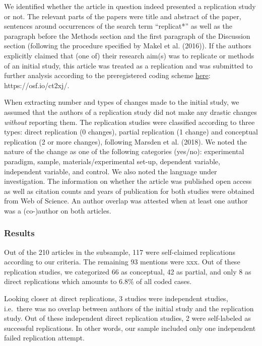 \documentclass[]{elsarticle} %
\begin{document}
We identified whether the article in question indeed presented a
replication study or not. The relevant parts of the papers were title
and abstract of the paper, sentences around occurrences of the search
term ``replicat*'' as well as the paragraph before the Methods section
and the first paragraph of the Discussion section (following the
procedure specified by Makel et al. (2016)). If the authors explicitly
claimed that (one of) their research aim(s) was to replicate or methods
of an initial study, this article was treated as a replication and was
submitted to further analysis according to the preregistered coding
scheme \href{https://osf.io/ct2xj/}{here}: https://osf.io/ct2xj/.

When extracting number and types of changes made to the initial study,
we assumed that the authors of a replication study did not make any
drastic changes \emph{without} reporting them. The replication studies
were classified according to three types: direct replication (0
changes), partial replication (1 change) and conceptual replication (2
or more changes), following Marsden et al. (2018). We noted the nature
of the change as one of the following categories (yes/no): experimental
paradigm, sample, materials/experimental set-up, dependent variable,
independent variable, and control. We also noted the language under
investigation. The information on whether the article was published open
access as well as citation counts and years of publication for both
studies were obtained from Web of Science. An author overlap was
attested when at least one author was a (co-)author on both articles.

\hypertarget{results-1}{%
\subsubsection{Results}\label{results-1}}

Out of the 210 articles in the subsample, 117 were self-claimed
replications according to our criteria. The remaining 93 mentions were
xxx. Out of these replication studies, we categorized 66 as conceptual,
42 as partial, and only 8 as direct replications which amounts to 6.8\%
of all coded cases.

Looking closer at direct replications, 3 studies were independent
studies, i.e.~there was no overlap between authors of the initial study
and the replication study. Out of these independent direct replication
studies, 2 were self-labeled as successful replications. In other words,
our sample included only one independent failed replication attempt.
\end{document}
